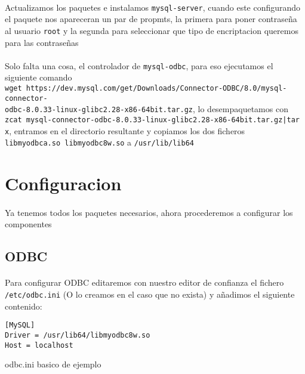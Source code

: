 \documentclass{article}
\begin{document}
			\paragraph{} Actualizamos los paquetes e instalamos \verb+mysql-server+, cuando este configurando el paquete nos apareceran un par de propmts, la primera para poner contraseña al usuario \verb+root+ y la segunda para seleccionar que tipo de encriptacion queremos para las contraseñas
			
			\paragraph{} Solo falta una cosa, el controlador de \verb+mysql-odbc+, para eso ejecutamos el siguiente comando \\\verb+wget https://dev.mysql.com/get/Downloads/Connector-ODBC/8.0/mysql-connector-+\\\verb+odbc-8.0.33-linux-glibc2.28-x86-64bit.tar.gz+, lo desempaquetamos con \\\verb+zcat mysql-connector-odbc-8.0.33-linux-glibc2.28-x86-64bit.tar.gz|tar x+, entramos en el directorio resultante y copiamos los dos ficheros \\\verb+libmyodbca.so libmyodbc8w.so+ a \verb+/usr/lib/lib64+
\newpage
\section{Configuracion}
	\paragraph{} {\huge Y}a tenemos todos los paquetes necesarios, ahora procederemos a configurar los componentes
	\subsection{ODBC}
		\paragraph{} Para configurar ODBC editaremos con nuestro editor de confianza el fichero \verb+/etc/odbc.ini+ (O lo creamos en el caso que no exista) y añadimos el siguiente contenido:
		\begin{listing}[h]
\verb+[MySQL]+\\
\verb+Driver = /usr/lib64/libmyodbc8w.so+\\
\verb+Host = localhost+
			\caption{odbc.ini basico de ejemplo}
		\end{listing}
\end{document}
